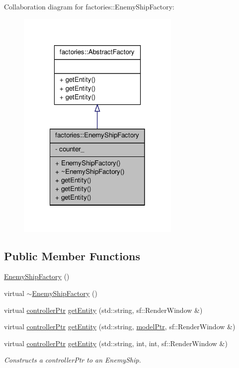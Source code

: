 \-Collaboration diagram for factories\-:\-:\-Enemy\-Ship\-Factory\-:\nopagebreak
\begin{figure}[H]
\begin{center}
\leavevmode
\includegraphics[width=222pt]{da/d24/classfactories_1_1EnemyShipFactory__coll__graph}
\end{center}
\end{figure}
\subsection*{\-Public \-Member \-Functions}
\begin{DoxyCompactItemize}
\item 
\hyperlink{classfactories_1_1EnemyShipFactory_a8a3299b6fb5a7086ed0a51f201e63212}{\-Enemy\-Ship\-Factory} ()
\item 
virtual \hyperlink{classfactories_1_1EnemyShipFactory_a3fd2b9229516a6fca99d0e7a63436c7a}{$\sim$\-Enemy\-Ship\-Factory} ()
\item 
virtual \hyperlink{Game_8h_a21b04f6cf2d5990b82725fac5ea2ce9a}{controller\-Ptr} \hyperlink{classfactories_1_1EnemyShipFactory_a5b7044ae923235d2cb1940b06ebd22cb}{get\-Entity} (std\-::string, sf\-::\-Render\-Window \&)
\item 
virtual \hyperlink{Game_8h_a21b04f6cf2d5990b82725fac5ea2ce9a}{controller\-Ptr} \hyperlink{classfactories_1_1EnemyShipFactory_a405f286b52252db71b1eddbfde7da672}{get\-Entity} (std\-::string, \hyperlink{ModelView_8h_a78966ddb517fca8d2b29a2bc5c31e74e}{model\-Ptr}, sf\-::\-Render\-Window \&)
\item 
virtual \hyperlink{Game_8h_a21b04f6cf2d5990b82725fac5ea2ce9a}{controller\-Ptr} \hyperlink{classfactories_1_1EnemyShipFactory_acb4c098348b33aa774696952171b2c7b}{get\-Entity} (std\-::string, int, int, sf\-::\-Render\-Window \&)
\begin{DoxyCompactList}\small\item\em \-Constructs a controller\-Ptr to an \-Enemy\-Ship. \end{DoxyCompactList}\end{DoxyCompactItemize}
